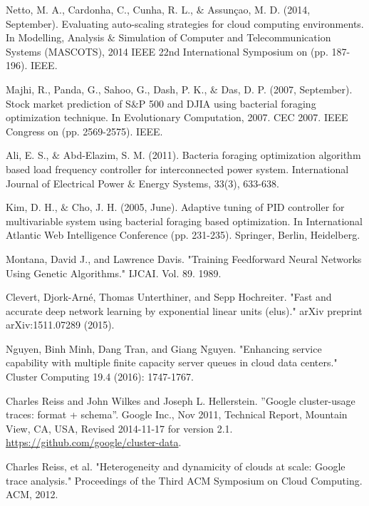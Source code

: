 \documentclass[runningheads]{llncs}
\begin{document}
\begin{thebibliography}{8}
%

Netto, M. A., Cardonha, C., Cunha, R. L., $\&$ Assunçao, M. D. (2014, September). Evaluating auto-scaling strategies for cloud computing environments. In Modelling, Analysis $\&$ Simulation of Computer and Telecommunication Systems (MASCOTS), 2014 IEEE 22nd International Symposium on (pp. 187-196). IEEE.

Majhi, R., Panda, G., Sahoo, G., Dash, P. K., $\&$ Das, D. P. (2007, September). Stock market prediction of S$\&$P 500 and DJIA using bacterial foraging optimization technique. In Evolutionary Computation, 2007. CEC 2007. IEEE Congress on (pp. 2569-2575). IEEE.

Ali, E. S., $\&$ Abd-Elazim, S. M. (2011). Bacteria foraging optimization algorithm based load frequency controller for interconnected power system. International Journal of Electrical Power $\&$ Energy Systems, 33(3), 633-638.

Kim, D. H., $\&$ Cho, J. H. (2005, June). Adaptive tuning of PID controller for multivariable system using bacterial foraging based optimization. In International Atlantic Web Intelligence Conference (pp. 231-235). Springer, Berlin, Heidelberg.

Montana, David J., and Lawrence Davis. "Training Feedforward Neural Networks Using Genetic Algorithms." IJCAI. Vol. 89. 1989.

Clevert, Djork-Arné, Thomas Unterthiner, and Sepp Hochreiter. "Fast and accurate deep network learning by exponential linear units (elus)." arXiv preprint arXiv:1511.07289 (2015).

Nguyen, Binh Minh, Dang Tran, and Giang Nguyen. "Enhancing service capability with multiple finite capacity server queues in cloud data centers." Cluster Computing 19.4 (2016): 1747-1767.

Charles Reiss and John Wilkes and Joseph L. Hellerstein. ''Google cluster-usage traces: format + schema''. Google Inc., Nov 2011, 
Technical Report, Mountain View, CA, USA, Revised 2014-11-17 for version 2.1. \url{https://github.com/google/cluster-data}.


Charles Reiss, et al. "Heterogeneity and dynamicity of clouds at scale: Google trace analysis." Proceedings of the Third ACM Symposium on Cloud Computing. ACM, 2012.

\end{thebibliography}
\end{document}

